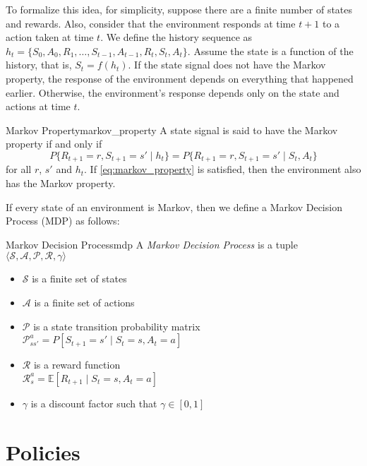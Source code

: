 To formalize this idea, for simplicity, suppose there are a finite number of states and rewards. Also, consider that the environment responds at time $t+1$ to a action taken at time $t$. We define the history sequence as $h_t = \{S_0, A_0, R_1, \dots, S_{t-1}, A_{t-1}, R_t, S_t, A_t\}$. Assume the state is a function of the history, that is, $S_t = f(h_t)$. If the state signal does not have the Markov property, the response of the environment depends on everything that happened earlier. Otherwise, the environment's response depends only on the state and actions at time $t$.
\begin{definition}{Markov Property}{markov_property}
      A state signal is said to have the Markov property if and only if
      \begin{equation}\label{eq:markov_property}
            P\{R_{t+1} = r, S_{t+1} = s' \mid h_t\} = P\{R_{t+1} = r, S_{t+1} = s' \mid S_t, A_t\}
      \end{equation}
      for all $r$, $s'$ and $h_t$. If \ref{eq:markov_property} is satisfied, then the environment also has the Markov property.   
\end{definition}
If every state of an environment is Markov, then we define a Markov Decision Process (MDP) as follows:
\begin{definition}{Markov Decision Process}{mdp}
      A \textit{Markov Decision Process} is a tuple $\langle \mathcal{S}, \mathcal{A}, \mathcal{P}, \mathcal{R}, \gamma \rangle$
      \begin{itemize}
            \item $\mathcal{S}$ is a finite set of states
            \item $\mathcal{A}$ is a finite set of actions
            \item $\mathcal{P}$ is a state transition probability matrix \\$\mathcal{P}^a_{ss'} = P[S_{t+1} = s' \mid S_t = s, A_t = a]$
            \item $\mathcal{R}$ is a reward function\\$\mathcal{R}^a_s = \mathbb{E}[R_{t+1} \mid S_t = s, A_t = a]$
            \item $\gamma$ is a discount factor such that $\gamma \in [0, 1]$
      \end{itemize}  
\end{definition}

\section{Policies}

